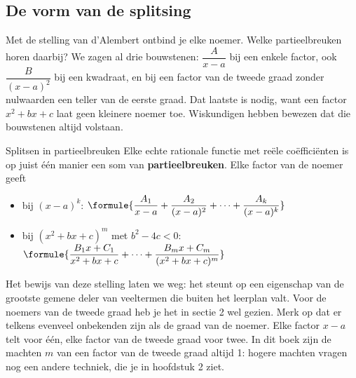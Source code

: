 \subsection{De vorm van de splitsing}

Met de stelling van d'Alembert ontbind je elke noemer. Welke partieelbreuken horen daarbij? We zagen al drie bouwstenen: $\dfrac{A}{x - a}$ bij een enkele factor, ook $\dfrac{B}{(x - a)^2}$ bij een kwadraat, en bij een factor van de tweede graad zonder nulwaarden een teller van de eerste graad. Dat laatste is nodig, want een factor $x^2 + bx + c$ laat geen kleinere noemer toe. Wiskundigen hebben bewezen dat die bouwstenen altijd volstaan.

\begin{theorie}
\begin{stelling}{Splitsen in partieelbreuken}
Elke echte rationale functie met reële coëfficiënten is op juist één manier een som van \textbf{\textcolor{accent}{partieelbreuken}}. Elke factor van de noemer geeft
\begin{itemize}
\item bij $(x - a)^k$: \qquad $\formule{\dfrac{A_1}{x - a} + \dfrac{A_2}{(x - a)^2} + \cdots + \dfrac{A_k}{(x - a)^k}}$
\item bij $(x^2 + bx + c)^m$ met $b^2 - 4c < 0$: \qquad $\formule{\dfrac{B_1x + C_1}{x^2 + bx + c} + \cdots + \dfrac{B_mx + C_m}{(x^2 + bx + c)^m}}$
\end{itemize}
\end{stelling}
\end{theorie}

Het bewijs van deze stelling laten we weg: het steunt op een eigenschap van de grootste gemene deler van veeltermen die buiten het leerplan valt. Voor de noemers van de tweede graad heb je het in sectie 2 wel gezien. Merk op dat er telkens evenveel onbekenden zijn als de graad van de noemer. Elke factor $x - a$ telt voor één, elke factor van de tweede graad voor twee. In dit boek zijn de machten $m$ van een factor van de tweede graad altijd 1: hogere machten vragen nog een andere techniek, die je in hoofdstuk 2 ziet.

